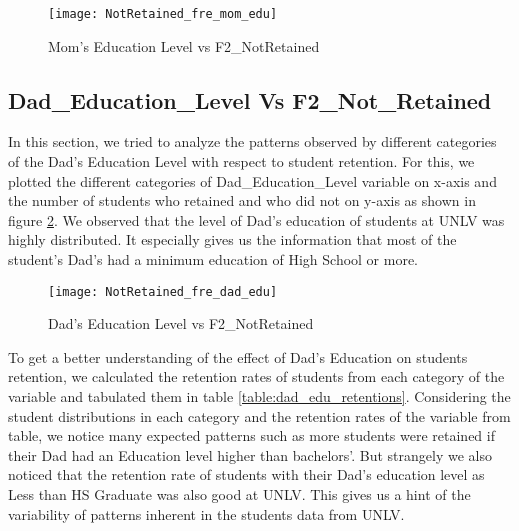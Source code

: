 \documentclass[11pt,openright]{report}
\begin{document}
\begin{figure}[!ht]
	\centering
	\texttt{[image: NotRetained\_fre\_mom\_edu]}
	\caption{Mom's Education Level vs F2\_NotRetained}
	\label{fig:mom_edu_F2NotRetained_plot}
\end{figure}


\subsection {Dad\_Education\_Level Vs F2\_Not\_Retained}
In this section, we tried to analyze the patterns observed by different categories of the Dad's Education Level with respect to student retention. For this, we plotted the different categories of Dad\_Education\_Level variable on x-axis and the number of students who retained and who did not on y-axis as shown in figure \ref{fig:dad_edu_F2NotRetained_plot}. We observed that the level of Dad's education of students at UNLV was highly distributed. It especially gives us the information that most of the student's Dad's had a minimum education of High School or more.

\begin{figure}[!htbp]
	\centering
	\texttt{[image: NotRetained\_fre\_dad\_edu]}
	\caption{Dad's Education Level vs F2\_NotRetained}
	\label{fig:dad_edu_F2NotRetained_plot}
\end{figure}

To get a better understanding of the effect of Dad's Education on students retention, we calculated the retention rates of students from each category of the variable and tabulated them in table  \ref{table:dad_edu_retentions}. Considering the student distributions in each category and the retention rates of the variable from table, we notice many expected patterns such as more students were retained if their Dad had an Education level higher than bachelors'. But strangely we also noticed that the retention rate of students with their Dad's education level as Less than HS Graduate was also good at UNLV. This gives us a hint of the variability of patterns inherent in the students data from UNLV.
\end{document}
